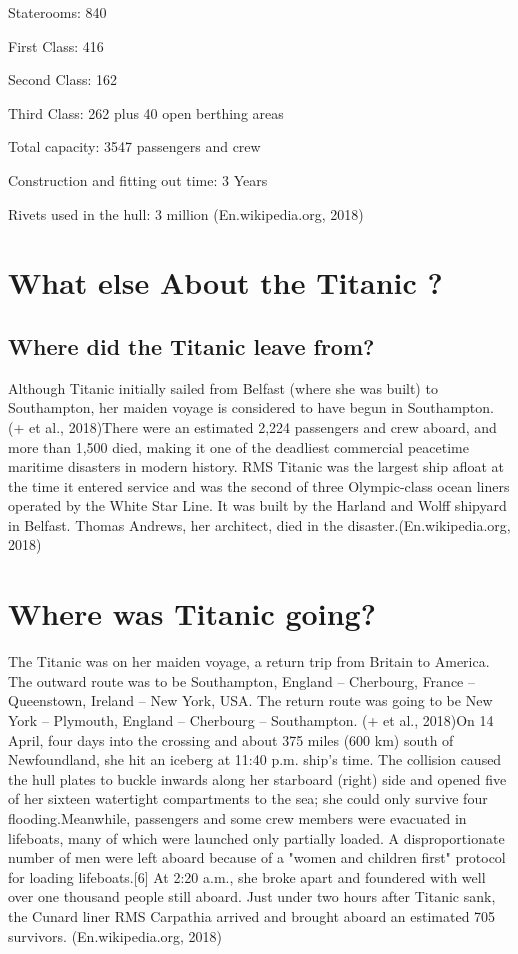 \documentclass[11pt]{article}
\begin{document}
Staterooms: 840

First Class: 416

Second Class: 162

Third Class: 262 plus 40 open berthing areas

Total capacity: 3547 passengers and crew

Construction and fitting out time: 3 Years

Rivets used in the hull: 3 million (En.wikipedia.org, 2018)

    \section{What else About the Titanic
?}\label{what-else-about-the-titanic}

    \subsection{Where did the Titanic leave
from?}\label{where-did-the-titanic-leave-from}

Although Titanic initially sailed from Belfast (where she was built) to
Southampton, her maiden voyage is considered to have begun in
Southampton. (+ et al., 2018)There were an estimated 2,224 passengers
and crew aboard, and more than 1,500 died, making it one of the
deadliest commercial peacetime maritime disasters in modern history. RMS
Titanic was the largest ship afloat at the time it entered service and
was the second of three Olympic-class ocean liners operated by the White
Star Line. It was built by the Harland and Wolff shipyard in Belfast.
Thomas Andrews, her architect, died in the disaster.(En.wikipedia.org,
2018)

    \section{Where was Titanic going?}\label{where-was-titanic-going}

The Titanic was on her maiden voyage, a return trip from Britain to
America. The outward route was to be Southampton, England -- Cherbourg,
France -- Queenstown, Ireland -- New York, USA. The return route was
going to be New York -- Plymouth, England -- Cherbourg -- Southampton.
(+ et al., 2018)On 14 April, four days into the crossing and about 375
miles (600 km) south of Newfoundland, she hit an iceberg at 11:40 p.m.
ship's time. The collision caused the hull plates to buckle inwards
along her starboard (right) side and opened five of her sixteen
watertight compartments to the sea; she could only survive four
flooding.Meanwhile, passengers and some crew members were evacuated in
lifeboats, many of which were launched only partially loaded. A
disproportionate number of men were left aboard because of a "women and
children first" protocol for loading lifeboats.{[}6{]} At 2:20 a.m., she
broke apart and foundered with well over one thousand people still
aboard. Just under two hours after Titanic sank, the Cunard liner RMS
Carpathia arrived and brought aboard an estimated 705 survivors.
(En.wikipedia.org, 2018)
\end{document}
